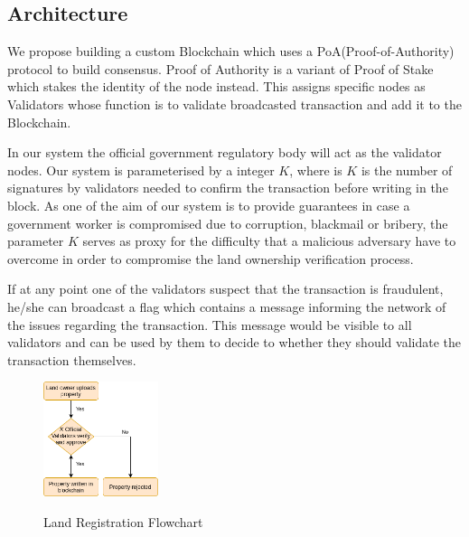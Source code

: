\documentclass[conference]{IEEEtran}
\begin{document}
\subsection{Architecture}

We propose building a custom Blockchain which uses a PoA(Proof-of-Authority) protocol to build consensus. Proof of Authority is a variant of Proof of Stake which stakes the identity of the node instead. This assigns specific nodes as Validators whose function is to validate broadcasted transaction and add it to the Blockchain.

In our system the official government regulatory body will act as the validator nodes. Our system is parameterised by a integer $K$, where is $K$ is the number of signatures by validators needed to confirm the transaction before writing in the block. As one of the aim of our system is to provide guarantees in case a government worker is compromised due to corruption, blackmail or bribery, the parameter $K$ serves as proxy for the difficulty that a malicious adversary have to overcome in order to compromise the land ownership verification process. 

If at any point one of the validators suspect that the transaction is fraudulent, he/she can broadcast a flag which contains a message informing the network of the issues regarding the transaction. This message would be visible to all validators and can be used by them to decide to whether they should validate the transaction themselves. 

\begin{figure}[h]
\centering
\includegraphics[width=0.3\textwidth]{LandRegister.png}
\begin{center}
    \tiny{Land Registration Flowchart}
\end{center}
\end{figure}
\end{document}

